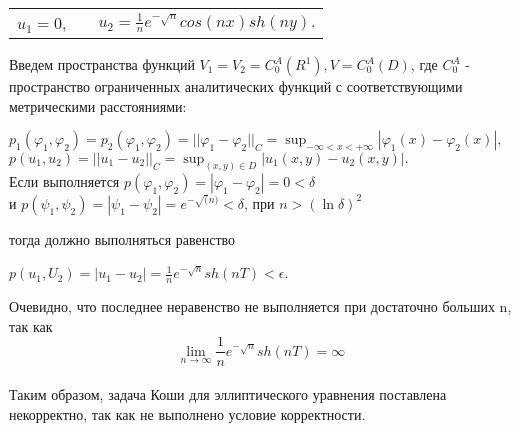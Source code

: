 \documentclass[../main.tex]{subfiles}
\begin{document}
\begin{center}
    \begin{tabular}{c c c}
         $u_1=0$, & & $u_2=\frac{1}{n}e^{-\sqrt{n}}cos(nx)sh(ny).$
    \end{tabular}
\end{center}

Введем пространства функций $V_1=V_2=C_0^A(R^1), V=C_0^A(D)$, где $C_0^A$ - пространство ограниченных аналитических функций с соответствующими метрическими расстояниями:
\begin{center}
$p_1(\varphi_1,\varphi_2)=p_2(\varphi_1, \varphi_2) =||\varphi_1-\varphi_2||_C = \sup_{-\infty<x<+\infty}|\varphi_1(x)-\varphi_2(x)|, $\\
$ $\\
$p(u_1, u_2)=||u_1-u_2||_C=\sup_{(x,y) \in D}|u_1(x,y)-u_2(x,y)|.$\\
$ $\\
Если выполняется $p(\varphi_1,\varphi_2)=|\varphi_1-\varphi_2|=0<\delta$\\
$ $\\
и $p(\psi_1,\psi_2)=|\psi_1-\psi_2|=e^{-\sqrt(n)}<\delta$, при $n>(\ln{\delta})^2$ 
\end{center}

тогда должно выполняться равенство

\begin{center}
$p(u_1,U_2)=|u_1-u_2|=\frac{1}{n}e^{-\sqrt{n}}sh(nT)<\epsilon$.
\end{center}

Очевидно, что последнее неравенство не выполняется при достаточно больших n, так как \[\lim_{n \to \infty}{\frac{1}{n}}e^{-\sqrt{n}}sh(nT)=\infty\]\\

Таким образом, задача Коши для эллиптического уравнения поставлена некорректно, так как не выполнено условие корректности.
\end{document}
